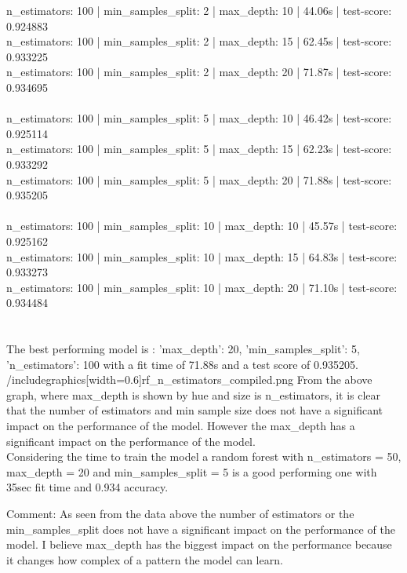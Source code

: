 \documentclass[12pt, letterpaper]{article}
\begin{document}
n_estimators: 100 | min_samples_split: 2 | max_depth: 10 | 44.06s | test-score: 0.924883 \\
n_estimators: 100 | min_samples_split: 2 | max_depth: 15 | 62.45s | test-score: 0.933225 \\
n_estimators: 100 | min_samples_split: 2 | max_depth: 20 | 71.87s | test-score: 0.934695 \\ \\
n_estimators: 100 | min_samples_split: 5 | max_depth: 10 | 46.42s | test-score: 0.925114 \\
n_estimators: 100 | min_samples_split: 5 | max_depth: 15 | 62.23s | test-score: 0.933292 \\
n_estimators: 100 | min_samples_split: 5 | max_depth: 20 | 71.88s | test-score: 0.935205 \\ \\
n_estimators: 100 | min_samples_split: 10 | max_depth: 10 | 45.57s | test-score: 0.925162 \\
n_estimators: 100 | min_samples_split: 10 | max_depth: 15 | 64.83s | test-score: 0.933273 \\
n_estimators: 100 | min_samples_split: 10 | max_depth: 20 | 71.10s | test-score: 0.934484 \\ \\ \\

The best performing model is : {'max_depth': 20, 'min_samples_split': 5, 'n_estimators': 100} with a fit time of 71.88s and a test score of 0.935205.
/includegraphics[width=0.6\textwidth]{rf_n_estimators_compiled.png}
From the above graph, where max_depth is shown by hue and size is n_estimators, it is clear that the number of estimators and min sample size does not have a significant impact on the performance of the model. 
However the max_depth has a significant impact on the performance of the model. \\ 
Considering the time to train the model a random forest with n_estimators = 50, max_depth = 20 and min_samples_split = 5 is a good performing one with 35sec fit time and 0.934 accuracy.

Comment:
As seen from the data above the number of estimators or the min_samples_split does not have a significant impact on the performance of the model.
I believe max_depth has the biggest impact on the performance because it changes how complex of a pattern the model can learn.
\end{document}
